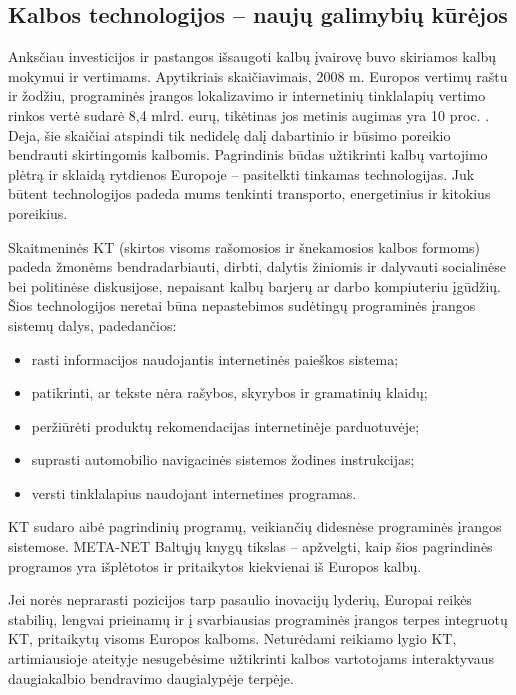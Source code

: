 \begin{multicols}{2}
\subsection{Kalbos technologijos – naujų galimybių kūrėjos}

Anksčiau investicijos ir pastangos išsaugoti kalbų įvairovę buvo skiriamos kalbų mokymui ir vertimams. Apytikriais skaičiavimais, 2008 m. Europos vertimų raštu ir žodžiu, programinės įrangos lokalizavimo ir internetinių tinklalapių vertimo rinkos vertė sudarė 8,4 mlrd. eurų, tikėtinas jos metinis augimas yra 10 proc. \cite{EC3}.  Deja, šie skaičiai atspindi tik nedidelę dalį dabartinio ir būsimo poreikio bendrauti skirtingomis kalbomis. Pagrindinis būdas užtikrinti kalbų vartojimo plėtrą ir sklaidą rytdienos Europoje – pasitelkti tinkamas technologijas. Juk būtent technologijos padeda mums tenkinti transporto, energetinius ir kitokius poreikius.


Skaitmeninės KT (skirtos visoms rašomosios ir šnekamosios kalbos formoms) padeda žmonėms bendradarbiauti, dirbti, dalytis žiniomis ir dalyvauti socialinėse bei politinėse diskusijose, nepaisant kalbų barjerų ar darbo kompiuteriu įgūdžių. Šios technologijos neretai būna nepastebimos sudėtingų programinės įrangos sistemų dalys, padedančios:

\begin{itemize}
\item rasti informacijos naudojantis internetinės paieškos sistema;
\item patikrinti, ar tekste nėra rašybos, skyrybos ir gramatinių klaidų;
\item peržiūrėti produktų rekomendacijas internetinėje parduotuvėje;
\item suprasti automobilio navigacinės sistemos žodines instrukcijas;
\item versti tinklalapius naudojant internetines programas.
\end{itemize}

KT sudaro aibė pagrindinių programų, veikiančių didesnėse programinės įrangos sistemose. META-NET Baltųjų knygų tikslas – apžvelgti, kaip šios pagrindinės programos yra išplėtotos ir pritaikytos kiekvienai iš Europos kalbų. 



Jei norės neprarasti pozicijos tarp pasaulio inovacijų lyderių, Europai reikės stabilių, lengvai prieinamų ir į svarbiausias programinės įrangos terpes integruotų KT, pritaikytų visoms Europos kalboms. Neturėdami reikiamo lygio KT, artimiausioje ateityje nesugebėsime užtikrinti kalbos vartotojams interaktyvaus daugiakalbio bendravimo daugialypėje terpėje.


\end{multicols}
